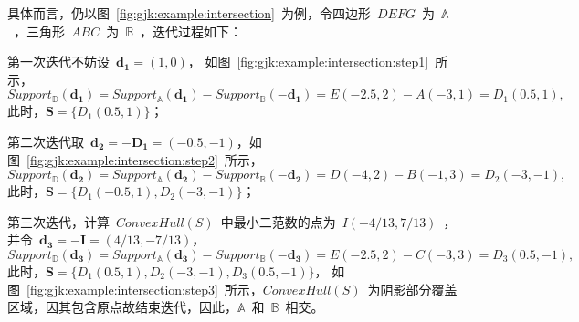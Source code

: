 具体而言，仍以图~\ref{fig:gjk:example:intersection}~为例，令四边形~$DEFG$~为~$\mathbb{A}$~，三角形~$ABC$~为~$\mathbb{B}$~，迭代过程如下：\\ \indent
\begin{inparaenum}[(1)]
\item 第一次迭代不妨设~$\bm{d_1} = (1,0)$，
如图~\ref{fig:gjk:example:intersection:step1}~所示，
$Support_\mathbb{D}(\bm{d_1})  = Support_\mathbb{A}(\bm{d_1}) - Support_\mathbb{B}(-\bm{d_1})  = E(-2.5, 2) - A(-3,1) = D_1(0.5, 1),$
此时，$\bm{S} = \{D_1(0.5, 1)\}$；\\ \indent
\item 第二次迭代取~$\bm{d_2}=-\bm{D_1}=(-0.5, -1)$，如图~\ref{fig:gjk:example:intersection:step2}~所示，
$Support_\mathbb{D}(\bm{d_2})   = Support_\mathbb{A}(\bm{d_2}) - Support_\mathbb{B}(-\bm{d_2})  = D(-4, 2) - B(-1, 3) = D_2(-3, -1),$
此时，$\bm{S} = \{D_1(-0.5, 1), D_2(-3, -1)\}$；\\ \indent
\item 第三次迭代，计算~$ConvexHull(S)$~中最小二范数的点为~$I(-4/13, 7/13)$~，
并令~$\bm{d_3}=-\bm{I}=(4/13, -7/13)$，
$ Support_\mathbb{D}(\bm{d_3})  = Support_\mathbb{A}(\bm{d_3}) - Support_\mathbb{B}(-\bm{d_3})  = E(-2.5, 2) - C(-3, 3) = D_3(0.5, -1),$
此时，$\bm{S} = \{D_1(0.5, 1), D_2(-3, -1), D_3(0.5, -1)\}$，
如图~\ref{fig:gjk:example:intersection:step3}~所示，$ConvexHull(S)$~为阴影部分覆盖区域，因其包含原点故结束迭代，因此，$\mathbb{A}$~和~$\mathbb{B}$~相交。
\end{inparaenum}
